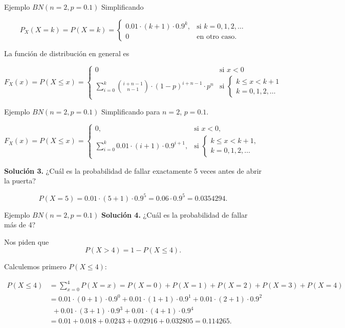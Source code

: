 \documentclass[
  ignorenonframetext,
  aspectratio=169]{beamer}
\begin{document}
\begin{frame}{Ejemplo \(BN(n=2,p=0.1)\)}
\protect\hypertarget{ejemplo-bnn2p0.1-1}{}
Simplificando

\[
P_X(X=k)=P(X=k)=
\left\{
\begin{array}{cc} 
0.01\cdot (k+1)\cdot 0.9^{k}, & \mbox{si }  k=0,1,2,\ldots \\ 0 & \mbox{en otro caso.}\end{array}\right.
\]

La función de distribución en general es

\[
F_X(x)=P(X\leq x)=
\left\{
\begin{array}{ll}
0 & \mbox{si } x<0 \\
\displaystyle\sum_{i=0}^{k }{i+n-1\choose n-1} \cdot (1-p)^{i+n-1}\cdot p^n 
& \mbox{si }\left\{\begin{array}{l} k\leq x< k+1\\k=0,1,2,\ldots\end{array}\right. 
\end{array}
\right.
\]
\end{frame}

\begin{frame}{Ejemplo \(BN(n=2,p=0.1)\)}
\protect\hypertarget{ejemplo-bnn2p0.1-2}{}
Simplificando para \(n=2\), \(p=0.1\).

\[
F_X(x)=P(X\leq x)=
\left\{
\begin{array}{ll}
0, & \mbox{si } x<0, \\
\displaystyle\sum_{i=0}^{k }0.01\cdot (i+1) \cdot 0.9^{i+1},
& \mbox{si }\left\{\begin{array}{l} k\leq x< k+1,\\k=0,1,2,\ldots\end{array}\right. 
\end{array}
\right.
\]

\textbf{Solución 3.} ¿Cuál es la probabilidad de fallar exactamente 5
veces antes de abrir la puerta?

\[
P(X=5)= 0.01\cdot (5+1) \cdot 0.9^{5}= 0.06 \cdot 0.9^{5}= 0.0354294.
\]
\end{frame}

\begin{frame}{Ejemplo \(BN(n=2,p=0.1)\)}
\protect\hypertarget{ejemplo-bnn2p0.1-3}{}
\textbf{Solución 4.} ¿Cuál es la probabilidad de fallar más de 4?

Nos piden que\\
\[
P(X>4)=1-P(X\leq 4).
\]

Calculemos primero \(P(X\leq 4):\)

\[
\begin{array}{rl}
P(X\leq 4) &=  \displaystyle\sum_{x=0}^{4} P(X=x)=P(X=0)+P(X=1)+P(X=2)+P(X=3)+P(X=4)\\
&= 0.01\cdot (0+1) \cdot 0.9^{0}+0.01\cdot (1+1) \cdot 0.9^{1}+0.01\cdot (2+1) \cdot 0.9^{2} \\ &\ \ 
+0.01\cdot (3+1) \cdot 0.9^{3} + 0.01\cdot (4+1) \cdot 0.9^{4} \\ & =
0.01 +0.018+0.0243+0.02916+0.032805 = 0.114265.
\end{array}
\]
\end{frame}
\end{document}
